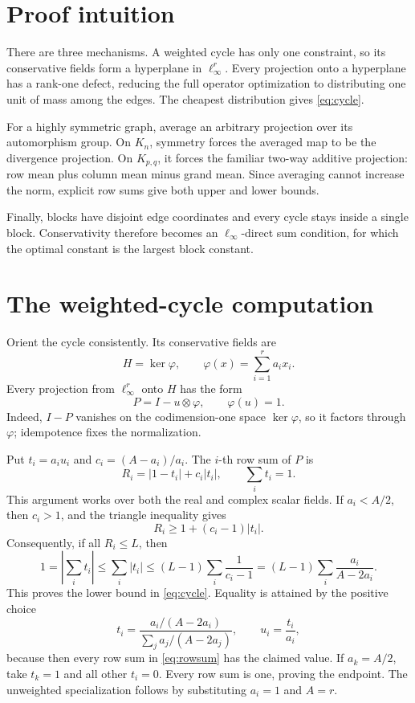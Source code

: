 \documentclass[11pt]{article}
\begin{document}
\section{Proof intuition}

There are three mechanisms.  A weighted cycle has only one constraint, so
its conservative fields form a hyperplane in \(\ell_\infty^r\).  Every
projection onto a hyperplane has a rank-one defect, reducing the full
operator optimization to distributing one unit of mass among the edges.
The cheapest distribution gives \eqref{eq:cycle}.

For a highly symmetric graph, average an arbitrary projection over its
automorphism group.  On \(K_n\), symmetry forces the averaged map to be the
divergence projection.  On \(K_{p,q}\), it forces the familiar two-way
additive projection: row mean plus column mean minus grand mean.  Since
averaging cannot increase the norm, explicit row sums give both upper and
lower bounds.

Finally, blocks have disjoint edge coordinates and every cycle stays
inside a single block.  Conservativity therefore becomes an
\(\ell_\infty\)-direct sum condition, for which the optimal constant is the
largest block constant.

\section{The weighted-cycle computation}

Orient the cycle consistently.  Its conservative fields are
\[
 H=\ker\varphi,\qquad \varphi(x)=\sum_{i=1}^r a_i x_i.
\]
Every projection from \(\ell_\infty^r\) onto \(H\) has the form
\[
 P=I-u\otimes\varphi,\qquad \varphi(u)=1.
\]
Indeed, \(I-P\) vanishes on the codimension-one space \(\ker\varphi\), so
it factors through \(\varphi\); idempotence fixes the normalization.

Put \(t_i=a_i u_i\) and \(c_i=(A-a_i)/a_i\).  The \(i\)-th row sum of
\(P\) is
\begin{equation}\label{eq:rowsum}
 R_i=|1-t_i|+c_i|t_i|,
 \qquad \sum_i t_i=1.
\end{equation}
This argument works over both the real and complex scalar fields.  If
\(a_i<A/2\), then \(c_i>1\), and the triangle inequality gives
\[
 R_i\geq 1+(c_i-1)|t_i|.
\]
Consequently, if all \(R_i\leq L\), then
\[
 1=\left|\sum_i t_i\right|
 \leq\sum_i|t_i|
 \leq(L-1)\sum_i\frac1{c_i-1}
 =(L-1)\sum_i\frac{a_i}{A-2a_i}.
\]
This proves the lower bound in \eqref{eq:cycle}.  Equality is attained by
the positive choice
\[
 t_i=\frac{a_i/(A-2a_i)}{\sum_j a_j/(A-2a_j)},
 \qquad u_i=\frac{t_i}{a_i},
\]
because then every row sum in \eqref{eq:rowsum} has the claimed value.
If \(a_k=A/2\), take \(t_k=1\) and all other \(t_i=0\).  Every row sum is
one, proving the endpoint.  The unweighted specialization follows by
substituting \(a_i=1\) and \(A=r\).
\end{document}
